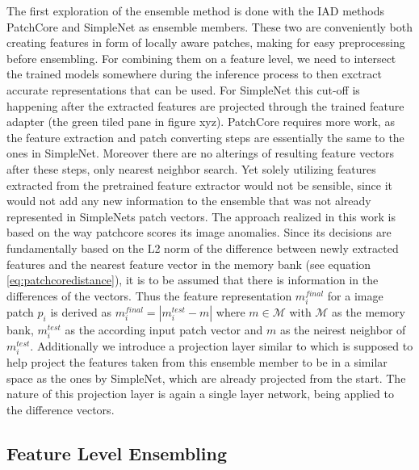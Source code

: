 The first exploration of the ensemble method is done with the IAD methods PatchCore \cite{patchCore2022} and SimpleNet \cite{liu2023simplenet} as ensemble members. These two 
are conveniently both creating features in form of locally aware patches, making for easy preprocessing before ensembling. For combining them on a 
feature level, we need to intersect the trained models somewhere during the inference process to then exctract accurate representations that can be used. 
For SimpleNet this cut-off is happening after the extracted features are projected through the trained feature adapter (the green tiled pane in figure xyz). 
PatchCore requires more work, as the feature extraction and patch converting steps are essentially the same to the ones in SimpleNet. Moreover there are no alterings of resulting feature vectors 
after these steps, only nearest neighbor search. Yet solely utilizing features extracted 
from the pretrained feature extractor would not be sensible, since it would not add any new information to the ensemble that was not already represented in SimpleNets patch vectors. 
The approach realized in this work is based on the way patchcore scores its image anomalies. Since its decisions are fundamentally based on the L2 norm of the difference between newly extracted 
features and the nearest feature vector in the memory bank (see equation \ref{eq:patchcoredistance}), it is to be assumed that there is information in the differences of the vectors. Thus the 
feature representation $m^{final}_i$ for a image patch $p_i$ is derived as $m^{final}_i = | m_i^{test} - m |$ where $m \in \mathcal{M}$ with $\mathcal{M}$ as the memory bank, $m_i^{test}$ as the 
according input patch vector and $m$ as the neirest neighbor of $m_i^{test}$. Additionally we introduce a projection layer similar to \cite{liu2023simplenet} which is supposed to help project the 
features taken from this ensemble member to be in a similar space as the ones by SimpleNet, which are already projected from the start. The nature of this projection layer is again a single 
layer network, being applied to the difference vectors.



\subsection{Feature Level Ensembling}
\label{sec:featurelevelensemble}

